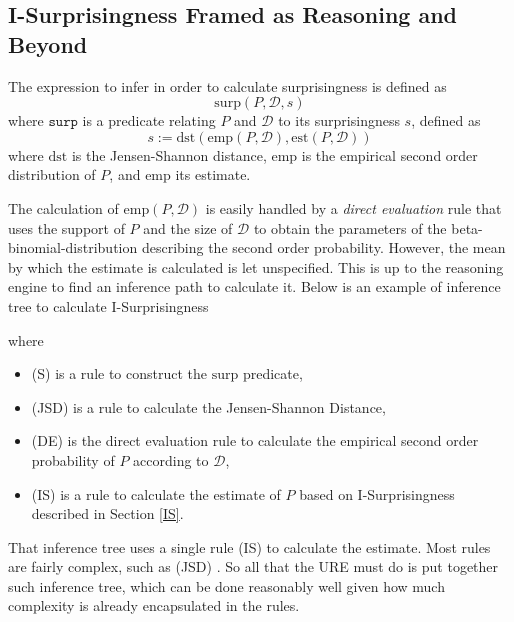 \documentclass[runningheads]{llncs}
\begin{document}
\subsection{I-Surprisingness Framed as Reasoning and Beyond}

The expression to infer in order to calculate surprisingness is
defined as
$$
\text{surp}(P, \mathcal{D}, s)
$$
where $\texttt{surp}$ is a predicate relating $P$ and $\mathcal{D}$ to
its surprisingness $s$, defined as
$$
s := \text{dst}(\text{emp}(P,\mathcal{D}),\text{est}(P,\mathcal{D}))
$$ where $\text{dst}$ is the Jensen-Shannon distance, $\text{emp}$ is
the empirical second order distribution of $P$, and $\text{emp}$ its
estimate.

The calculation of $\text{emp}(P, \mathcal{D})$ is easily handled by a
\emph{direct evaluation} rule that uses the support of $P$ and the
size of $\mathcal{D}$ to obtain the parameters of the
beta-binomial-distribution describing the second order probability.
However, the mean by which the estimate is calculated is let
unspecified. This is up to the reasoning engine to find an inference
path to calculate it. Below is an example of inference tree to
calculate I-Surprisingness
\begin{prooftree}




\end{prooftree}
where
\begin{itemize}
\item (S) is a rule to construct the $\text{surp}$ predicate,
\item (JSD) is a rule to calculate the Jensen-Shannon Distance,
\item (DE) is the direct evaluation rule to calculate the empirical
  second order probability of $P$ according to $\mathcal{D}$,
\item (IS) is a rule to calculate the estimate of $P$ based on
  I-Surprisingness described in Section \ref{IS}.
\end{itemize}
That inference tree uses a single rule (IS) to calculate the
estimate. Most rules are fairly complex, such as (JSD)
. So all that the URE must do
is put together such inference tree, which can be done reasonably well
given how much complexity is already encapsulated in the rules.
\end{document}
